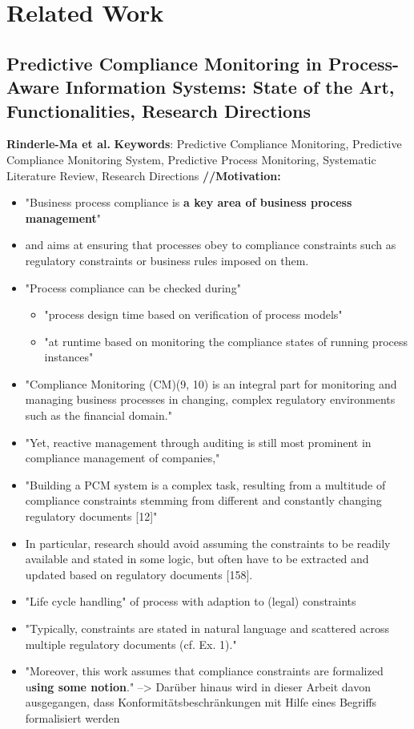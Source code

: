 \chapter{Related Work}
\label{sec:rel}

\section{Predictive Compliance Monitoring in Process-Aware Information Systems: State of the Art, Functionalities, Research Directions}
\textbf{Rinderle-Ma et al.} \cite{rinderle-maPredictiveComplianceMonitoring2023}
\textbf{Keywords}: Predictive Compliance Monitoring, Predictive Compliance Monitoring System, Predictive Process Monitoring, Systematic Literature Review, Research Directions
\textbf{//Motivation:}
\begin{itemize}
\item "Business process compliance is\textbf{ a key area of business process management}"
\item and aims at ensuring that processes obey to compliance constraints such as regulatory constraints or business rules imposed on them.
\item "Process compliance can be checked during"
\begin{itemize}
\item "process design time based on verification of process models"
\item "at runtime based on monitoring the compliance states of running process instances"
\end{itemize}
\item "Compliance Monitoring (CM)(9, 10) is an integral part for monitoring and managing business processes in changing, complex regulatory environments such as the financial domain." 
\item "Yet, reactive management through auditing is still most prominent in compliance management of companies,"
\item "Building a PCM system is a complex task, resulting from a multitude of compliance constraints stemming from different and constantly changing regulatory documents [12]"
\item In particular, research should avoid assuming the constraints to be readily available and stated in some logic, but often have to be extracted and updated based on regulatory documents [158].
\item "Life cycle handling" of process with adaption to (legal) constraints
\item "Typically, constraints are stated in natural language and scattered across multiple regulatory documents (cf. Ex. 1)."
\item "Moreover, this work assumes that compliance constraints are formalized u\textbf{sing some notion}." --> Darüber hinaus wird in dieser Arbeit davon ausgegangen, dass Konformitätsbeschränkungen mit Hilfe eines Begriffs formalisiert werden
\end{itemize}

